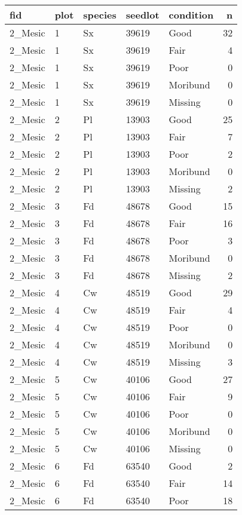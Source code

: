 \documentclass[
]{article}
\begin{document}
\begin{tabular}{l|l|l|l|l|r}
\hline
fid & plot & species & seedlot & condition & n\\
\hline
2\_Mesic & 1 & Sx & 39619 & Good & 32\\
\hline
2\_Mesic & 1 & Sx & 39619 & Fair & 4\\
\hline
2\_Mesic & 1 & Sx & 39619 & Poor & 0\\
\hline
2\_Mesic & 1 & Sx & 39619 & Moribund & 0\\
\hline
2\_Mesic & 1 & Sx & 39619 & Missing & 0\\
\hline
2\_Mesic & 2 & Pl & 13903 & Good & 25\\
\hline
2\_Mesic & 2 & Pl & 13903 & Fair & 7\\
\hline
2\_Mesic & 2 & Pl & 13903 & Poor & 2\\
\hline
2\_Mesic & 2 & Pl & 13903 & Moribund & 0\\
\hline
2\_Mesic & 2 & Pl & 13903 & Missing & 2\\
\hline
2\_Mesic & 3 & Fd & 48678 & Good & 15\\
\hline
2\_Mesic & 3 & Fd & 48678 & Fair & 16\\
\hline
2\_Mesic & 3 & Fd & 48678 & Poor & 3\\
\hline
2\_Mesic & 3 & Fd & 48678 & Moribund & 0\\
\hline
2\_Mesic & 3 & Fd & 48678 & Missing & 2\\
\hline
2\_Mesic & 4 & Cw & 48519 & Good & 29\\
\hline
2\_Mesic & 4 & Cw & 48519 & Fair & 4\\
\hline
2\_Mesic & 4 & Cw & 48519 & Poor & 0\\
\hline
2\_Mesic & 4 & Cw & 48519 & Moribund & 0\\
\hline
2\_Mesic & 4 & Cw & 48519 & Missing & 3\\
\hline
2\_Mesic & 5 & Cw & 40106 & Good & 27\\
\hline
2\_Mesic & 5 & Cw & 40106 & Fair & 9\\
\hline
2\_Mesic & 5 & Cw & 40106 & Poor & 0\\
\hline
2\_Mesic & 5 & Cw & 40106 & Moribund & 0\\
\hline
2\_Mesic & 5 & Cw & 40106 & Missing & 0\\
\hline
2\_Mesic & 6 & Fd & 63540 & Good & 2\\
\hline
2\_Mesic & 6 & Fd & 63540 & Fair & 14\\
\hline
2\_Mesic & 6 & Fd & 63540 & Poor & 18\\

\end{tabular}
\end{document}

